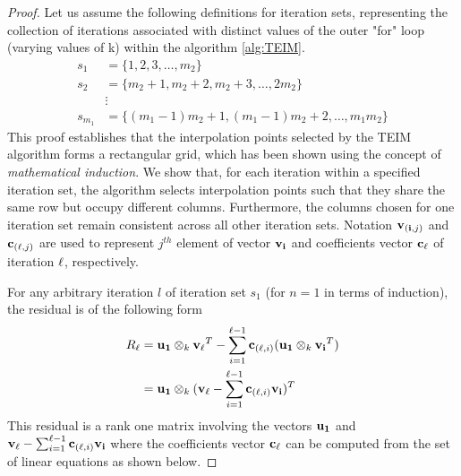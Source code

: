\documentclass{article}
\begin{document}
\begin{proof}
  Let us assume the following definitions for iteration sets, representing the collection of iterations associated with distinct values of the outer "for" loop (varying values of k) within the algorithm \ref{alg:TEIM}.
\begin{align*}
   s_1&=\{1,2,3,\dots,m_2\}\\
   s_2&=\{m_2+1,m_2+2,m_2+3,\dots,2m_2\} \\
   &\vdots\\
   s_{m_1}&=\{(m_1-1)m_2+1,(m_1-1)m_2+2,\dots,m_1m_2\} 
\end{align*}
This proof establishes that the interpolation points selected by the TEIM algorithm forms a rectangular grid, which has been shown using the concept of \emph{mathematical induction}. We show that, for each iteration within a specified iteration set, the algorithm selects interpolation points such that they share the same row but occupy different columns. Furthermore, the columns chosen for one iteration set remain consistent across all other iteration sets. Notation $\bold{v}_{(\bold{i},j)}$ and $\bold{c}_{(\bold{\ell},j)}$ are used to represent $j^{th}$ element of vector $\bold{v}_{\bold{i}}$ and coefficients vector $\bold{c}_{\bold{\ell}}$ of iteration $\bold{\ell}$, respectively.


For any arbitrary iteration $l$ of iteration set $s_1$ (for $n=1$ in terms of induction), the residual is of the following form
\begin{equation*}
\begin{split}
            R_{\ell} &= \bold{u_1}\otimes_k \bold{v_\ell}^T - \sum_{i=1}^{\ell-1}\bold{c}_{(\bold{\ell},i)}(\bold{u_1}\otimes_k \bold{v_i}^T)\\
               &=\bold{u_1}\otimes_k(\bold{v_\ell} -\sum_{i=1}^{\ell-1}\bold{c}_{(\bold{\ell},i)}\bold{v_i})^T\\
\end{split}                   
\end{equation*}
This residual is a rank one matrix involving the vectors $\bold{u_1}$ and $\bold{v_\ell} -\sum_{i=1}^{\ell-1}\bold{c}_{(\bold{\ell},i)}\bold{v_i}$ where the coefficients vector $\bold{c}_{\bold{\ell}}$ can be computed from the set of linear equations as shown below.


\end{proof}
\end{document}
